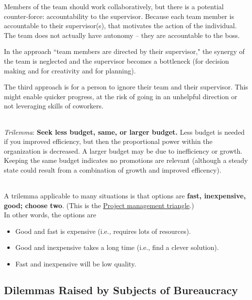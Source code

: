 Members of the team should work collaboratively, but there is a potential counter-force: accountability to the supervisor. Because each team member is accountable to their supervisor(s), that motivates the action of the individual. The team does not actually have autonomy -- they are accountable to the boss.

In the approach ``team members are directed by their supervisor," the synergy of the team is neglected and the supervisor becomes a bottleneck (for decision making and for creativity and for planning).

The third approach is for a person to ignore their team and their supervisor. This might enable quicker progress, at the risk of going in an unhelpful direction or not leveraging skills of coworkers. 

\ \\

\textit{Trilemma}:
\textbf{Seek less budget, same, or larger budget.} 
Less budget is needed if you improved efficiency, but then the proportional power within the organization is decreased. A larger budget may be due to inefficiency or growth. Keeping the same budget indicates no promotions are relevant (although a steady state could result from a combination of growth and improved efficency). 

\ \\

A trilemma applicable to many situations is that options are \textbf{fast, inexpensive, good; choose two}. 
(This is the \href{https://en.wikipedia.org/wiki/Project_management_triangle}{Project management triangle}.) 
\\
In other words, the options are
\begin{itemize}
    \item Good and fast is expensive (i.e., requires lots of resources).
    \item Good and inexpensive takes a long time (i.e., find a clever solution).
    \item Fast and inexpensive will be low quality.
\end{itemize}

\subsection*{Dilemmas Raised by Subjects of Bureaucracy\label{sec:subjects-dilemmas}}

